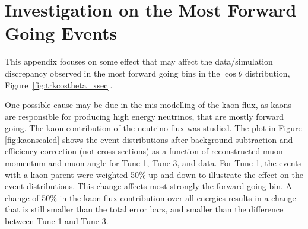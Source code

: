 \chapter{Investigation on the Most Forward Going Events}
\label{app:forward_investigation}

This appendix focuses on some effect that may affect the data/simulation discrepancy observed in the most forward going bins in the $\cos\theta$ distribution, Figure~\ref{fig:trkcostheta_xsec}.

One possible cause may be due in the mis-modelling of the kaon flux, as kaons are responsible for producing high energy neutrinos, that are mostly forward going. 
%
%
The kaon contribution of the neutrino flux was studied. The plot in Figure \ref{fig:kaonscaled} shows the event distributions after background subtraction and efficiency correction (not cross sections) as a function of reconstructed muon momentum and muon angle for Tune 1, Tune 3, and data. For Tune 1, the events with a kaon parent were weighted 50\% up and down to illustrate the effect on the event distributions. This change affects most strongly the forward going bin. A change of 50\% in the kaon flux contribution over all energies results in a change that is still smaller than the total error bars, and smaller than the difference between Tune 1 and Tune 3.

